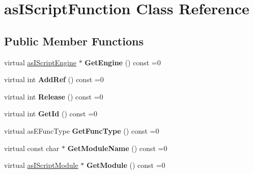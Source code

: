 \hypertarget{classas_i_script_function}{}\section{as\+I\+Script\+Function Class Reference}
\label{classas_i_script_function}
\subsection*{Public Member Functions}
\begin{DoxyCompactItemize}
\item 
\mbox{\label{classas_i_script_function_a7a0ef04f035d1809fb8b7702134afd06}} 
virtual \hyperlink{classas_i_script_engine}{as\+I\+Script\+Engine} $\ast$ {\bfseries Get\+Engine} () const =0
\item 
\mbox{\label{classas_i_script_function_a0a00f9581e7ece5f2a536d0e22c10d0c}} 
virtual int {\bfseries Add\+Ref} () const =0
\item 
\mbox{\label{classas_i_script_function_a0a98f1f7f91574a11d7d8c5062bdcdee}} 
virtual int {\bfseries Release} () const =0
\item 
\mbox{\label{classas_i_script_function_a7aca255486dd77b8846f545495128cac}} 
virtual int {\bfseries Get\+Id} () const =0
\item 
\mbox{\label{classas_i_script_function_aa4d06c7d590e7eb4df280a8224f4499c}} 
virtual as\+E\+Func\+Type {\bfseries Get\+Func\+Type} () const =0
\item 
\mbox{\label{classas_i_script_function_af03c30e4764f81c01400d7f77a8d0832}} 
virtual const char $\ast$ {\bfseries Get\+Module\+Name} () const =0
\item 
\mbox{\label{classas_i_script_function_a5c3477dd6b634e6b6ca3d5b97f6d5b30}} 
virtual \hyperlink{classas_i_script_module}{as\+I\+Script\+Module} $\ast$ {\bfseries Get\+Module} () const =0
\item 
\mbox{\label{classas_i_script_function_a62a77c029782162135d98d6e2b383eca}} 

\end{DoxyCompactItemize}
